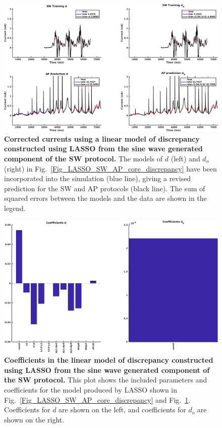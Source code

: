 \documentclass[11pt,a4paper,oneside]{article}
\begin{document}
{\begin{figure}[hb]
\begin{center}
\includegraphics[scale=0.42]{Figures/LASSO_SW_AP_core_currents.png}
\caption{\textbf{Corrected currents using a linear model of discrepancy constructed using LASSO from the sine wave generated component of the SW protocol.} The models of $d$ (left) and $d_o$ (right) in Fig.~\ref{Fig_LASSO_SW_AP_core_discrepancy} have been incorporated into the simulation (blue line), giving a revised prediction for the SW and AP protocols (black line). The sum of squared errors between the models and the data are shown in the legend.}
\label{Fig_LASSO_SW_AP_core_currents}
\end{center}
\end{figure}

\clearpage

\begin{figure}[t]
\begin{center}
\includegraphics[scale=0.42]{Figures/LASSO_SW_AP_core_coefficients.png}
\caption{\textbf{Coefficients in the linear model of discrepancy constructed using LASSO from the sine wave generated component of the SW protocol.} This plot shows the included parameters and coefficients for the model produced by LASSO shown in Fig.~\ref{Fig_LASSO_SW_AP_core_discrepancy} and Fig.~\ref{Fig_LASSO_SW_AP_core_currents}. Coefficients for $d$ are shown on the left, and coefficients for $d_o$ are shown on the right.} 
\label{Fig_LASSO_SW_AP_core_coefficients}
\end{center}
\end{figure}

}
\end{document}
